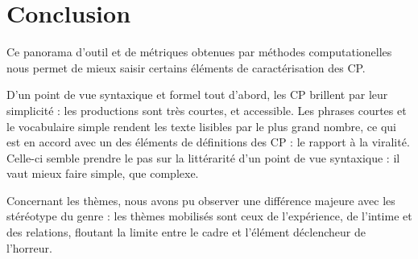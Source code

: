 \documentclass[12pt,a4paper,oneside,titlepage]{book} %
\begin{document}
%	
%


\section{Conclusion}
Ce panorama d'outil et de métriques obtenues par méthodes computationelles nous permet de mieux saisir certains éléments de caractérisation des CP. 
\par
D'un point de vue syntaxique et formel tout d'abord,  les CP brillent par leur simplicité : les productions sont très courtes, et accessible. Les phrases courtes et le vocabulaire simple rendent les texte lisibles par le plus grand nombre, ce qui est en accord avec un des éléments de définitions des CP : le rapport à la viralité. Celle-ci semble prendre le pas sur la littérarité d'un point de vue syntaxique : il vaut mieux faire simple, que complexe.

\par Concernant les thèmes, nous avons pu observer une différence majeure avec les stéréotype du genre : les thèmes mobilisés sont ceux de l'expérience, de l'intime et des relations, floutant la limite entre le cadre et l'élément déclencheur de l'horreur.
\end{document}
